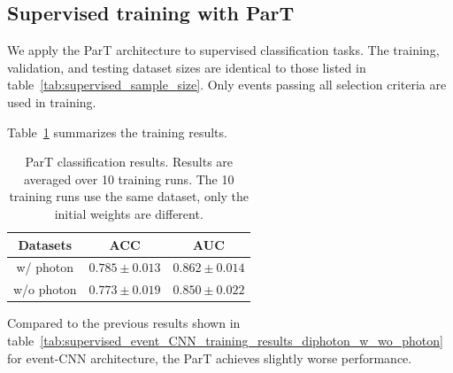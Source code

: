 \documentclass[12pt]{article}
\begin{document}
    \subsection{Supervised training with ParT}%
    \label{sub:supervised_training_with_part}
        We apply the ParT architecture to supervised classification tasks. The training, validation, and testing dataset sizes are identical to those listed in table~\ref{tab:supervised_sample_size}. Only events passing all selection criteria are used in training.

		Table~\ref{tab:supervised_ParT_training_results} summarizes the training results. 
        \begin{table}[htpb]
            \centering
            \caption{ParT classification results. Results are averaged over 10 training runs. The 10 training runs use the same dataset, only the initial weights are different.}
            \label{tab:supervised_ParT_training_results}
            \begin{tabular}{c|cc}
                 Datasets  & ACC               & AUC               \\ \hline
                 w/ photon & $0.785 \pm 0.013$ & $0.862 \pm 0.014$ \\
                 w/o photon & $0.773 \pm 0.019$ & $0.850 \pm 0.022$ \\
			\end{tabular}
        \end{table}
		Compared to the previous results shown in table~\ref{tab:supervised_event_CNN_training_results_diphoton_w_wo_photon} for event-CNN architecture, the ParT achieves slightly worse performance.
\end{document}
